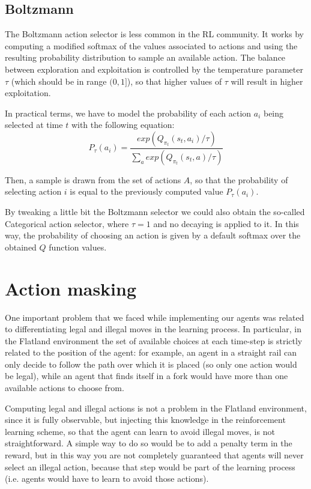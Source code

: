 \documentclass[a4paper,10pt]{report}
\begin{document}
\subsection{Boltzmann}\label{subsec:boltzmann}
The Boltzmann action selector is less common in the RL community. It works by computing a modified softmax of the values associated to actions and using the resulting probability distribution to sample an available action. The balance between exploration and exploitation is controlled by the temperature parameter $\tau$ (which should be in range $(0,1]$), so that higher values of $\tau$ will result in higher exploitation. 

In practical terms, we have to model the probability of each action $a_i$ being selected at time $t$ with the following equation:
$$
P_\tau(a_i) = \frac{exp(Q_{\pi_t}(s_t,a_i) / \tau)}{\sum_{a}exp(Q_{\pi_t}(s_t,a) / \tau)}
$$

Then, a sample is drawn from the set of actions $A$, so that the probability of selecting action $i$ is equal to the previously computed value $P_\tau(a_i)$.

By tweaking a little bit the Boltzmann selector we could also obtain the so-called Categorical action selector, where $\tau=1$ and no decaying is applied to it. In this way, the probability of choosing an action is given by a default softmax over the obtained $Q$ function values.

\section{Action masking}
One important problem that we faced while implementing our agents was related to differentiating legal and illegal moves in the learning process. In particular, in the Flatland environment the set of available choices at each time-step is strictly related to the position of the agent: for example, an agent in a straight rail can only decide to follow the path over which it is placed (so only one action would be legal), while an agent that finds itself in a fork would have more than one available actions to choose from.

Computing legal and illegal actions is not a problem in the Flatland environment, since it is fully observable, but injecting this knowledge in the reinforcement learning scheme, so that the agent can learn to avoid illegal moves, is not straightforward. A simple way to do so would be to add a penalty term in the reward, but in this way you are not completely guaranteed that agents will never select an illegal action, because that step would be part of the learning process (i.e. agents would have to learn to avoid those actions).
\end{document}
